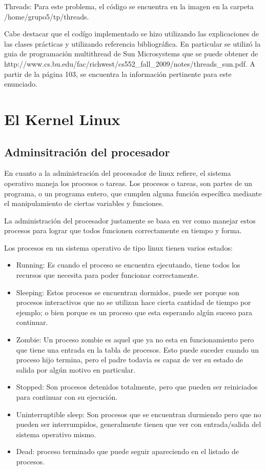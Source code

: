 \documentclass[a4paper, 12pt]{article}
\begin{document}
\bigskip

Threads: Para este problema, el c\'odigo se encuentra en la imagen en la carpeta /home/grupo5/tp/threads. 

Cabe destacar que el cod\'igo implementado se hizo utilizando las explicaciones de las clases pr\'acticas y utilizando referencia bibliogr\'afica. En particular se utiliz\'o la guia de programaci\'on multithread de Sun Microsystems que se puede obtener de http://www.cs.bu.edu/fac/richwest/cs552\_fall\_2009/notes/threads\_sun.pdf. A partir de la p\'agina 103, se encuentra la informaci\'on pertinente para este enunciado.


\section*{El Kernel Linux}

\subsection*{Adminsitraci\'on del procesador}

En cuanto a la administraci\'on del procesador de linux refiere, el sistema operativo maneja los procesos o tareas. Los procesos o tareas, son partes de un programa, o un programa entero, que cumplen alguna funci\'on espec\'ifica mediante el manipulamiento de ciertas variables y funciones. 

La administraci\'on del procesador justamente se basa en ver como manejar estos procesos para lograr que todos funcionen correctamente en tiempo y forma. 

Los procesos en un sistema operativo de tipo linux tienen varios estados:

\begin{itemize}
\item Running: Es cuando el proceso se encuentra ejecutando, tiene todos los recursos que necesita para poder funcionar correctamente.
\item Sleeping: Estos procesos se encuentran dormidos, puede ser porque son procesos interactivos que no se utilizan hace cierta cantidad de tiempo por ejemplo; o bien porque es un proceso que esta esperando alg\'un suceso para continuar.
\item Zombie: Un proceso zombie es aquel que ya no esta en funcionamiento pero que tiene una entrada en la tabla de procesos. Esto puede suceder cuando un proceso hijo termina, pero el padre todavia es capaz de ver su estado de salida por alg\'un motivo en particular. 
\item Stopped: Son procesos detenidos totalmente, pero que pueden ser reiniciados para continuar con su ejecuci\'on. 
\item Uninterruptible sleep: Son procesos que se encuentran durmiendo pero que no pueden ser interrumpidos, generalmente tienen que ver con entrada/salida del sistema operativo mismo.
\item Dead: proceso terminado que puede seguir apareciendo en el listado de procesos.
\end{itemize}
\end{document}
